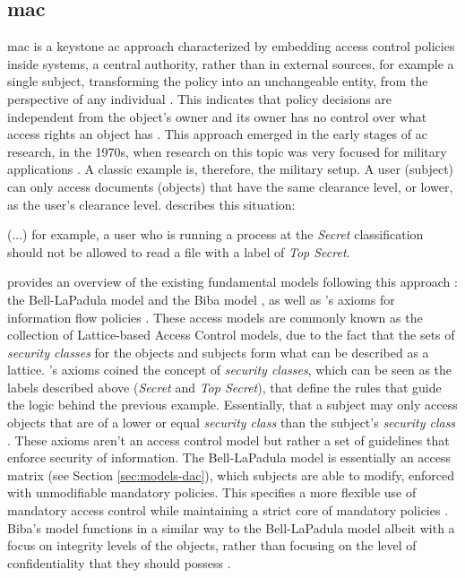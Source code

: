 \subsection{\glsdesc{mac}}
\label{sec:models-mac}

\glsdesc{mac} is a keystone \gls{ac} approach characterized by embedding access control policies inside systems, a central authority, rather than in external sources, for example a single subject, transforming the policy into an unchangeable entity, from the perspective of any individual \cite[23]{biba_integrity_1977}.  This indicates that policy decisions are independent from the object's owner and its owner has no control over what access rights an object has \cite[7]{hu_assessment_2006}. This approach emerged in the early stages of \gls{ac} research, in the 1970s, when research on this topic was very focused for military applications \cite{sandhu_lattice-based_1993}. A classic example is, therefore, the military setup. A user (subject) can only access documents (objects) that have the same clearance level, or lower, as the user's clearance level. \cite{hu_assessment_2006} describes this situation:

\begin{displayquote}
	(...) for example, a user who is running a process at the \textit{Secret} classification should not be allowed to read a file with a label of \textit{Top Secret}. \cite[7]{hu_assessment_2006}
\end{displayquote}

\citeauthor{sandhu_lattice-based_1993} \cite{sandhu_lattice-based_1993} provides an overview of the existing fundamental models following this approach \cite{sandhu_lattice-based_1993}: the Bell-LaPadula model \cite{bell_secure_1973} and the Biba model \cite{biba_integrity_1977}, as well as \citeauthor{denning_lattice_1976}'s axioms for information flow policies \cite{denning_lattice_1976}. These access models are commonly known as the collection of Lattice-based Access Control models, due to the fact that the sets of \textit{security classes} for the objects and subjects form what can be described as a lattice. \citeauthor{denning_lattice_1976}'s axioms coined the concept of \textit{security classes}, which can be seen as the labels described above (\emph{Secret} and \emph{Top Secret}), that define the rules that guide the logic behind the previous example. Essentially, that a subject may only access objects that are of a lower or equal \textit{security class} than the subject's \emph{security class} \cite[1-4]{sandhu_lattice-based_1993}. These axioms aren't an access control model but rather a set of guidelines that enforce security of information. The Bell-LaPadula model is essentially an access matrix (see Section \ref{sec:models-dac}), which subjects are able to modify, enforced with unmodifiable mandatory policies. This specifies a more flexible use of mandatory access control while maintaining a strict core of mandatory policies \cite[9-11]{sandhu_lattice-based_1993}. Biba's model functions in a similar way to the Bell-LaPadula model albeit with a focus on integrity levels of the objects, rather than focusing on the level of confidentiality that they should possess \cite[11-13]{sandhu_lattice-based_1993}.

